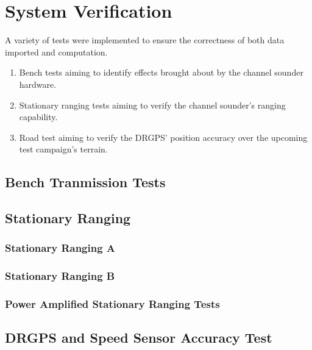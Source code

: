 \chapter{System Verification}\label{sec:Verification}\label{sec:verify}
A variety of tests were implemented to ensure the correctness of both data imported and computation.
\begin{enumerate}
   \item Bench tests aiming to identify effects brought about by the channel sounder hardware.
   \item Stationary ranging tests aiming to verify the channel sounder's ranging capability. 
   \item Road test aiming to verify the DRGPS' position accuracy over the upcoming test campaign's terrain.
\end{enumerate}

\section{Bench Tranmission Tests}\label{sec:Verification_BenchTests}

\section{Stationary Ranging}

\subsection{Stationary Ranging A}

\subsection{Stationary Ranging B}

\subsection{Power Amplified Stationary Ranging Tests}

\section{DRGPS and Speed Sensor Accuracy Test}
